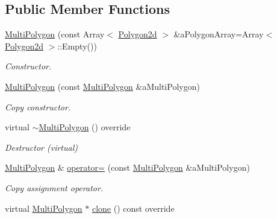 \subsection*{Public Member Functions}
\begin{DoxyCompactItemize}
\item 
\hyperlink{classostk_1_1math_1_1geom_1_1d2_1_1objects_1_1_multi_polygon_a70327c4d3f7f19f5ae9b32c0a715f1fd}{Multi\+Polygon} (const Array$<$ \hyperlink{namespaceostk_1_1math_1_1geom_1_1d2_1_1objects_a5786a3021d23f9c64937e263a2da9d27}{Polygon2d} $>$ \&a\+Polygon\+Array=Array$<$ \hyperlink{namespaceostk_1_1math_1_1geom_1_1d2_1_1objects_a5786a3021d23f9c64937e263a2da9d27}{Polygon2d} $>$\+::Empty())
\begin{DoxyCompactList}\small\item\em Constructor. \end{DoxyCompactList}\item 
\hyperlink{classostk_1_1math_1_1geom_1_1d2_1_1objects_1_1_multi_polygon_ac5b053bb605f9c24de35f0e35e3b1ee8}{Multi\+Polygon} (const \hyperlink{classostk_1_1math_1_1geom_1_1d2_1_1objects_1_1_multi_polygon}{Multi\+Polygon} \&a\+Multi\+Polygon)
\begin{DoxyCompactList}\small\item\em Copy constructor. \end{DoxyCompactList}\item 
virtual \hyperlink{classostk_1_1math_1_1geom_1_1d2_1_1objects_1_1_multi_polygon_a00964958733e630a99d445f72b9c27ba}{$\sim$\+Multi\+Polygon} () override
\begin{DoxyCompactList}\small\item\em Destructor (virtual) \end{DoxyCompactList}\item 
\hyperlink{classostk_1_1math_1_1geom_1_1d2_1_1objects_1_1_multi_polygon}{Multi\+Polygon} \& \hyperlink{classostk_1_1math_1_1geom_1_1d2_1_1objects_1_1_multi_polygon_a7864532e16a3db3ced54c09f40218af9}{operator=} (const \hyperlink{classostk_1_1math_1_1geom_1_1d2_1_1objects_1_1_multi_polygon}{Multi\+Polygon} \&a\+Multi\+Polygon)
\begin{DoxyCompactList}\small\item\em Copy assignment operator. \end{DoxyCompactList}\item 
virtual \hyperlink{classostk_1_1math_1_1geom_1_1d2_1_1objects_1_1_multi_polygon}{Multi\+Polygon} $\ast$ \hyperlink{classostk_1_1math_1_1geom_1_1d2_1_1objects_1_1_multi_polygon_a89fdf23e9f496c2e5f598c0dc8981c86}{clone} () const override

\end{DoxyCompactItemize}
